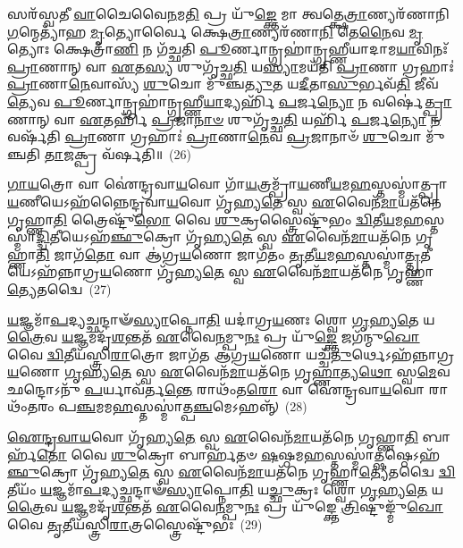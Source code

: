 𑌸𑌰᳴𑌸𑍍𑌵𑌤𑍀 \ul{𑌵𑌾}\-𑌚𑍈𑌵𑍈\-\ul{𑌨}\-𑌮\-\ul{𑌤𑌿} 𑌪𑍍𑌰 𑌯𑍁᳴\-\ul{𑌙𑍍𑌕𑍍𑌤𑍇} 𑌮𑌾 𑌤𑍍𑌵𑌤𑍍𑌕𑍍𑌷𑍇\-\ul{𑌤𑍍𑌰𑌾}\-𑌣𑍍𑌯𑌰᳴𑌣𑌾𑌨𑌿 \ul{𑌗}\-𑌨𑍍𑌮𑍇𑌤𑍍𑌯𑌾᳴𑌹 \ul{𑌮𑍃}\-𑌤𑍍𑌯𑍋𑌰𑍍𑌵𑍈 𑌕𑍍𑌷𑍇\-\ul{𑌤𑍍𑌰𑌾}\-𑌣𑍍𑌯𑌰᳴𑌣𑌾\-\ul{𑌨𑌿} 𑌤𑍇\-\ul{𑌨𑍈}\-𑌵 \ul{𑌮𑍃}\-𑌤𑍍𑌯𑍋𑌃 𑌕𑍍𑌷𑍇𑌤𑍍𑌰𑌾᳴\-\ul{𑌣𑌿} 𑌨 𑌗᳴𑌚𑍍𑌛𑌤𑌿 \ul{𑌪𑍂}\-𑌰𑍍𑌣𑌾𑌨𑍍𑌗𑍍𑌰𑌹𑌾॑𑌨𑍍𑌗𑍃𑌹𑍍𑌣𑍀𑌯𑌾𑌦𑌾𑌮\-\ul{𑌯𑌾}\-𑌵𑌿𑌨𑌃᳴ \ul{𑌪𑍍𑌰𑌾}\-𑌣𑌾𑌨𑍍 𑌵𑌾 \ul{𑌏}\-𑌤\-\ul{𑌸𑍍𑌯} 𑌶𑍁𑌗𑍃᳴𑌚𑍍𑌛\-\ul{𑌤𑌿} 𑌯\-\ul{𑌸𑍍𑌯𑌾}\-𑌮𑌯᳴𑌤𑌿 \ul{𑌪𑍍𑌰𑌾}\-𑌣𑌾 𑌗𑍍𑌰𑌹𑌾𑌃॑ \ul{𑌪𑍍𑌰𑌾}\-𑌣𑌾\-\ul{𑌨𑍇}\-𑌵𑌾𑌸𑍍𑌯᳴ \ul{𑌶𑍁}\-𑌚𑍋 𑌮𑍁᳴𑌞𑍍𑌚\-\ul{𑌤𑍍𑌯𑍁}\-𑌤 𑌯\-\ul{𑌦𑍀}\-𑌤𑌾\-\ul{𑌸𑍁}\-𑌰𑍍𑌭𑌵᳴\-\ul{𑌤𑌿} 𑌜𑍀𑌵᳴\-\ul{𑌤𑍍𑌯𑍇}\-𑌵 \ul{𑌪𑍂}\-𑌰𑍍𑌣𑌾𑌨𑍍𑌗𑍍𑌰𑌹𑌾॑𑌨𑍍𑌗𑍃𑌹𑍍𑌣𑍀\-\ul{𑌯𑌾}\-𑌦𑍍𑌯𑌰𑍍\mbox{}𑌹𑌿᳴ \ul{𑌪}\-𑌰𑍍𑌜\-\ul{𑌨𑍍𑌯𑍋} 𑌨 𑌵𑌰𑍍\mbox{}𑌷𑍇॑\-\ul{𑌤𑍍𑌪𑍍𑌰𑌾}\-𑌣𑌾𑌨𑍍 𑌵𑌾 \ul{𑌏}\-𑌤𑌰𑍍\mbox{}𑌹𑌿᳴ \ul{𑌪𑍍𑌰}\-𑌜𑌾\-\ul{𑌨𑌾}\-\-\ul{𑍞} 𑌶𑍁𑌗𑍃᳴𑌚𑍍𑌛\-\ul{𑌤𑌿} 𑌯𑌰𑍍\mbox{}𑌹𑌿᳴ \ul{𑌪}\-𑌰𑍍𑌜\-\ul{𑌨𑍍𑌯𑍋} \ul{𑌨} 𑌵𑌰𑍍\mbox{}𑌷᳴𑌤𑌿 \ul{𑌪𑍍𑌰𑌾}\-𑌣𑌾 𑌗𑍍𑌰𑌹𑌾𑌃॑ \ul{𑌪𑍍𑌰𑌾}\-𑌣𑌾\-\ul{𑌨𑍇}\-𑌵 \ul{𑌪𑍍𑌰}\-𑌜𑌾𑌨𑌾𑍞᳴ \ul{𑌶𑍁}\-𑌚𑍋 𑌮𑍁᳴𑌞𑍍𑌚𑌤𑌿 \ul{𑌤𑌾}\-𑌜𑌕𑍍𑌪𑍍𑌰 𑌵᳴𑌰𑍍\mbox{}𑌷𑌤𑌿॥~(26)

{\anuvakamend[{\-\ul{𑌪𑍍𑌰}\-𑌮𑍀𑌯𑍇᳴𑌤 𑌮\-\ul{𑌨𑍁}\-𑌷𑍍𑌯᳴ 𑌋𑌧𑍍𑌯\-\ul{𑌤𑍇} 𑌯𑌸𑍍𑌯᳴ \ul{𑌪𑌿}\-𑌤𑌾 𑌪𑌿᳴𑌤𑌾\-\ul{𑌮}\-𑌹𑌃 𑌪𑍁\-\ul{𑌣𑍍𑌯𑍋} 𑌵𑌾𑌗𑍍𑌵𑌾 \ul{𑌏}\-𑌵 \ul{𑌪𑍂}\-𑌰𑍍𑌣𑌾𑌨𑍍𑌗𑍍𑌰\-\ul{𑌹𑌾}\-𑌨𑍍𑌪𑌞𑍍𑌚᳴𑌵𑌿𑍞𑌶𑌤𑌿𑌶𑍍𑌚}]}%

\-\ul{𑌗𑌾}\-\-\ul{𑌯}\-𑌤𑍍𑌰𑍋 𑌵𑌾 𑌐॑𑌨𑍍𑌦𑍍𑌰𑌵𑌾\-\ul{𑌯}\-𑌵𑍋 𑌗𑌾᳴\-\ul{𑌯}\-𑌤𑍍𑌰𑌮𑍍𑌪𑍍𑌰𑌾᳴\-\ul{𑌯}\-𑌣𑍀\-\ul{𑌯}\-𑌮\-\ul{𑌹}\-𑌸𑍍𑌤𑌸𑍍𑌮𑌾॑𑌤𑍍𑌪𑍍𑌰𑌾\-\ul{𑌯}\-𑌣𑍀𑌯𑍇\-𑌽𑌹᳴𑌨𑍍𑌨𑍈𑌨𑍍𑌦𑍍𑌰𑌵𑌾\-\ul{𑌯}\-𑌵𑍋 𑌗𑍃᳴𑌹𑍍𑌯\-\ul{𑌤𑍇} 𑌸𑍍𑌵 \ul{𑌏}\-𑌵𑍈𑌨᳴\-\ul{𑌮𑌾}\-𑌯𑌤᳴𑌨𑍇 𑌗𑍃𑌹𑍍𑌣𑌾\-\ul{𑌤𑌿} 𑌤𑍍𑌰𑍈𑌷𑍍𑌟𑍁᳴\-\ul{𑌭𑍋} 𑌵𑍈 \ul{𑌶𑍁}\-𑌕𑍍𑌰𑌸𑍍𑌤𑍍𑌰𑍈𑌷𑍍𑌟𑍁᳴𑌭𑌂 \ul{𑌦𑍍𑌵𑌿}\-𑌤𑍀\-\ul{𑌯}\-𑌮\-\ul{𑌹}\-𑌸𑍍𑌤𑌸𑍍𑌮𑌾॑\-\ul{𑌦𑍍𑌦𑍍𑌵𑌿}\-𑌤𑍀𑌯𑍇\-𑌽𑌹᳴\-\ul{𑌞𑍍𑌛𑍁}\-𑌕𑍍𑌰𑍋 𑌗𑍃᳴𑌹𑍍𑌯\-\ul{𑌤𑍇} 𑌸𑍍𑌵 \ul{𑌏}\-𑌵𑍈𑌨᳴\-\ul{𑌮𑌾}\-𑌯𑌤᳴𑌨𑍇 𑌗𑍃𑌹𑍍𑌣𑌾\-\ul{𑌤𑌿} 𑌜𑌾𑌗᳴\-\ul{𑌤𑍋} 𑌵𑌾 𑌆॑𑌗𑍍𑌰\-\ul{𑌯}\-𑌣𑍋 𑌜𑌾𑌗᳴𑌤𑌂 \ul{𑌤𑍃}\-𑌤𑍀\-\ul{𑌯}\-𑌮\-\ul{𑌹}\-𑌸𑍍𑌤𑌸𑍍𑌮𑌾॑\-\ul{𑌤𑍍𑌤𑍃}\-𑌤𑍀𑌯𑍇\-𑌽𑌹᳴𑌨𑍍𑌨𑌾𑌗𑍍𑌰\-\ul{𑌯}\-𑌣𑍋 𑌗𑍃᳴𑌹𑍍𑌯\-\ul{𑌤𑍇} 𑌸𑍍𑌵 \ul{𑌏}\-𑌵𑍈𑌨᳴\-\ul{𑌮𑌾}\-𑌯𑌤᳴𑌨𑍇 𑌗𑍃𑌹𑍍𑌣𑌾\-\ul{𑌤𑍍𑌯𑍇}\-𑌤𑌦𑍍𑌵𑍈~(27)

\-\ul{𑌯}\-𑌜𑍍𑌞𑌮𑌾᳴\-\ul{𑌪}\-𑌦𑍍𑌯𑌚𑍍𑌛𑌨𑍍𑌦𑌾𑍟᳴\-\ul{𑌸𑍍𑌯𑌾}\-𑌪𑍍𑌨𑍋\-\ul{𑌤𑌿} 𑌯𑌦𑌾॑𑌗𑍍𑌰\-\ul{𑌯}\-𑌣𑌃 𑌶𑍍𑌵𑍋 \ul{𑌗𑍃}\-𑌹𑍍𑌯\-\ul{𑌤𑍇} 𑌯\-\ul{𑌤𑍍𑌰𑍈}\-𑌵 \ul{𑌯}\-𑌜𑍍𑌞𑌮𑌦𑍃᳴\-\ul{𑌶}\-𑌨𑍍𑌤𑌤᳴ \ul{𑌏}\-𑌵𑍈\-\ul{𑌨}\-𑌮𑍍𑌪𑍁\-\ul{𑌨𑌃} 𑌪𑍍𑌰 𑌯𑍁᳴\-\ul{𑌙𑍍𑌕𑍍𑌤𑍇} 𑌜𑌗᳴𑌨𑍍𑌮𑍁\-\ul{𑌖𑍋} 𑌵𑍈 \ul{𑌦𑍍𑌵𑌿}\-𑌤𑍀𑌯᳴𑌸𑍍𑌤𑍍𑌰𑌿\-\ul{𑌰𑌾}\-𑌤𑍍𑌰𑍋 𑌜𑌾𑌗᳴𑌤 𑌆𑌗𑍍𑌰\-\ul{𑌯}\-𑌣𑍋 𑌯𑌚𑍍𑌚᳴\-\ul{𑌤𑍁}\-𑌰𑍍𑌥𑍇\-𑌽𑌹᳴𑌨𑍍𑌨𑌾𑌗𑍍𑌰\-\ul{𑌯}\-𑌣𑍋 \ul{𑌗𑍃}\-𑌹𑍍𑌯\-\ul{𑌤𑍇} 𑌸𑍍𑌵 \ul{𑌏}\-𑌵𑍈𑌨᳴\-\ul{𑌮𑌾}\-𑌯𑌤᳴𑌨𑍇 𑌗𑍃\-\ul{𑌹𑍍𑌣𑌾}\-𑌤𑍍𑌯\-\ul{𑌥𑍋} 𑌸𑍍𑌵\-\ul{𑌮𑍇}\-𑌵 𑌛𑌨𑍍𑌦𑍋\-𑌽𑌨𑍁᳴ \ul{𑌪}\-𑌰𑍍𑌯𑌾𑌵᳴𑌰𑍍𑌤\-\ul{𑌨𑍍𑌤𑍇} 𑌰𑌾𑌥𑌂᳴𑌤\-\ul{𑌰𑍋} 𑌵𑌾 𑌐॑𑌨𑍍𑌦𑍍𑌰𑌵𑌾\-\ul{𑌯}\-𑌵𑍋 𑌰𑌾𑌥𑌂᳴𑌤𑌰𑌂 𑌪\-\ul{𑌞𑍍𑌚}\-𑌮𑌮\-\ul{𑌹}\-𑌸𑍍𑌤𑌸𑍍𑌮𑌾॑𑌤𑍍𑌪\-\ul{𑌞𑍍𑌚}\-𑌮𑍇\-𑌽𑌹𑌨𑍍𑌨𑍍᳴~(28)

\-\ul{𑌐}\-\-\ul{𑌨𑍍𑌦𑍍𑌰}\-\-\ul{𑌵𑌾}\-\-\ul{𑌯}\-𑌵𑍋 𑌗𑍃᳴𑌹𑍍𑌯\-\ul{𑌤𑍇} 𑌸𑍍𑌵 \ul{𑌏}\-𑌵𑍈𑌨᳴\-\ul{𑌮𑌾}\-𑌯𑌤᳴𑌨𑍇 𑌗𑍃𑌹𑍍𑌣𑌾\-\ul{𑌤𑌿} 𑌬𑌾𑌰𑍍\mbox{}𑌹᳴\-\ul{𑌤𑍋} 𑌵𑍈 \ul{𑌶𑍁}\-𑌕𑍍𑌰𑍋 𑌬𑌾𑌰𑍍\mbox{}𑌹᳴𑌤𑍞 \ul{𑌷}\-𑌷𑍍𑌠𑌮\-\ul{𑌹}\-𑌸𑍍𑌤𑌸𑍍𑌮𑌾॑\-\ul{𑌤𑍍𑌷}\-𑌷𑍍𑌠𑍇\-𑌽𑌹᳴\-\ul{𑌞𑍍𑌛𑍁}\-𑌕𑍍𑌰𑍋 𑌗𑍃᳴𑌹𑍍𑌯\-\ul{𑌤𑍇} 𑌸𑍍𑌵 \ul{𑌏}\-𑌵𑍈𑌨᳴\-\ul{𑌮𑌾}\-𑌯𑌤᳴𑌨𑍇 𑌗𑍃𑌹𑍍𑌣𑌾\-\ul{𑌤𑍍𑌯𑍇}\-𑌤𑌦𑍍𑌵𑍈 \ul{𑌦𑍍𑌵𑌿}\-𑌤𑍀𑌯𑌂᳴ \ul{𑌯}\-𑌜𑍍𑌞𑌮𑌾᳴\-\ul{𑌪}\-𑌦𑍍𑌯𑌚𑍍𑌛𑌨𑍍𑌦𑌾𑍟᳴\-\ul{𑌸𑍍𑌯𑌾}\-𑌪𑍍𑌨𑍋\-\ul{𑌤𑌿} 𑌯\-\ul{𑌚𑍍𑌛𑍁}\-𑌕𑍍𑌰𑌃 𑌶𑍍𑌵𑍋 \ul{𑌗𑍃}\-𑌹𑍍𑌯\-\ul{𑌤𑍇} 𑌯\-\ul{𑌤𑍍𑌰𑍈}\-𑌵 \ul{𑌯}\-𑌜𑍍𑌞𑌮𑌦𑍃᳴\-\ul{𑌶}\-𑌨𑍍𑌤𑌤᳴ \ul{𑌏}\-𑌵𑍈\-\ul{𑌨}\-𑌮𑍍𑌪𑍁\-\ul{𑌨𑌃} 𑌪𑍍𑌰 𑌯𑍁᳴𑌙𑍍𑌕𑍍𑌤𑍇 \ul{𑌤𑍍𑌰𑌿}\-𑌷𑍍𑌟𑍁𑌙𑍍𑌮𑍁᳴\-\ul{𑌖𑍋} 𑌵𑍈 \ul{𑌤𑍃}\-𑌤𑍀𑌯᳴𑌸𑍍𑌤𑍍𑌰𑌿\-\ul{𑌰𑌾}\-𑌤𑍍𑌰𑌸𑍍𑌤𑍍𑌰𑍈𑌷𑍍𑌟𑍁᳴𑌭𑌃~(29)

